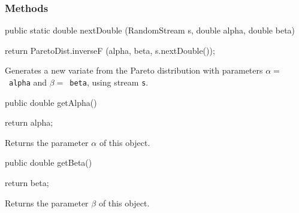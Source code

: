 \subsubsection* {Methods}
\begin{code}

   public static double nextDouble (RandomStream s,
                                    double alpha, double beta)\begin{hide} {
      return ParetoDist.inverseF (alpha, beta, s.nextDouble());
   }\end{hide}
\end{code}
\begin{tabb}  Generates a new variate from the Pareto distribution
   with parameters $\alpha = $~\texttt{alpha} and $\beta = $~\texttt{beta}, 
   using stream \texttt{s}.
\end{tabb}
\begin{code}

   public double getAlpha()\begin{hide} {
      return alpha;
   }\end{hide}
\end{code}
\begin{tabb} Returns the parameter $\alpha$ of this object.
\end{tabb}
\begin{code}

   public double getBeta()\begin{hide} {
      return beta;
   }\end{hide}
\end{code}
\begin{tabb} Returns the parameter $\beta$ of this object.
\end{tabb}
\begin{code}\begin{hide}

   protected void setParams (double alpha, double beta) {
      if (alpha <= 0.0)
         throw new IllegalArgumentException ("alpha <= 0");
      if (beta <= 0.0)
         throw new IllegalArgumentException ("beta <= 0");
      this.alpha = alpha;
      this.beta = beta;
   }
}\end{hide}
\end{code}
